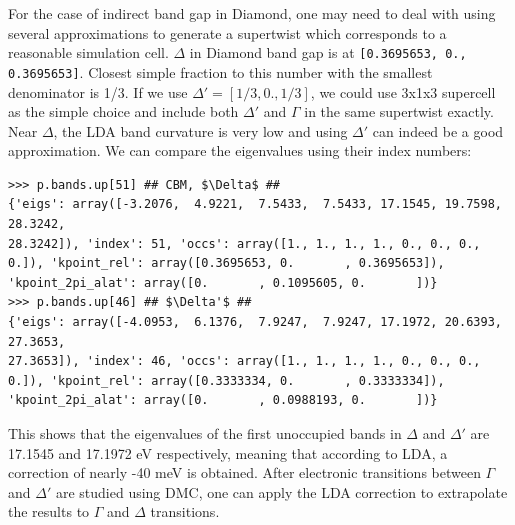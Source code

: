For the case of indirect band gap in Diamond, one may need to deal with using several approximations to generate a supertwist which corresponds to a reasonable simulation cell. 
$\Delta$ in Diamond band gap is at \texttt{[0.3695653, 0., 0.3695653]}. 
Closest simple fraction to this number with the smallest denominator is 1/3. If we use $\Delta'=[1/3, 0., 1/3]$, we could use 3x1x3 supercell as the simple choice and include both $\Delta'$ and $\Gamma$ in the same supertwist exactly. 
Near  $\Delta$, the LDA band curvature is very low and using  $\Delta'$ can indeed be a good approximation. 
We can compare the eigenvalues using their index numbers:
\begin{lstlisting}[mathescape=true]
>>> p.bands.up[51] ## CBM, $\Delta$ ##
{'eigs': array([-3.2076,  4.9221,  7.5433,  7.5433, 17.1545, 19.7598, 28.3242,
28.3242]), 'index': 51, 'occs': array([1., 1., 1., 1., 0., 0., 0., 0.]), 'kpoint_rel': array([0.3695653, 0.       , 0.3695653]), 'kpoint_2pi_alat': array([0.       , 0.1095605, 0.       ])}
>>> p.bands.up[46] ## $\Delta'$ ##
{'eigs': array([-4.0953,  6.1376,  7.9247,  7.9247, 17.1972, 20.6393, 27.3653,
27.3653]), 'index': 46, 'occs': array([1., 1., 1., 1., 0., 0., 0., 0.]), 'kpoint_rel': array([0.3333334, 0.       , 0.3333334]), 'kpoint_2pi_alat': array([0.       , 0.0988193, 0.       ])}
\end{lstlisting}
This shows that the eigenvalues of the first unoccupied bands in $\Delta$ and $\Delta'$ are 17.1545 and 17.1972 eV respectively, meaning that according to LDA, a correction of nearly -40 meV is obtained. 
After electronic transitions between $\Gamma$ and $\Delta'$ are studied using DMC, one can apply the LDA correction to extrapolate the results to $\Gamma$ and $\Delta$ transitions.

